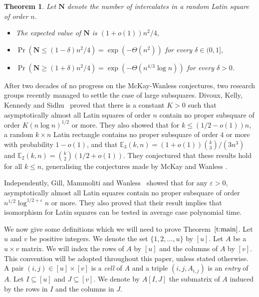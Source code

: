 \documentclass[12pt]{article}
\newtheorem{thm}{Theorem}[section]
\theoremstyle{definition}
\numberwithin{equation}{section}
\def\tref#1{Theorem~$\ref{#1}$}
\renewcommand{\geq}{\geqslant}
\renewcommand{\leq}{\leqslant}
\renewcommand{\le}{\leqslant}
\newcommand{\E}{\mathbb{E}}
\renewcommand{\epsilon}{\varepsilon}
\begin{document}
	\begin{thm}\label{t:intercs}
	  Let $\mathbf{N}$ denote the number of intercalates in a random Latin
	  square of order $n$.
	  \begin{itemize}
	  \item The expected value of $\mathbf{N}$ is $(1+o(1))n^2/4$,
	  \item $\Pr(\mathbf{N} \leq (1-\delta)n^2/4) = \exp(-\Theta(n^2))$ for every $\delta \in (0, 1]$,
	  \item $\Pr(\mathbf{N} \geq (1+\delta)n^2/4) = \exp(-\Theta(n^{4/3}\log n))$ for every $\delta>0$.
	  \end{itemize} 
	\end{thm}
	
	After two decades of no progress on the McKay-Wanless
        conjectures, two research groups recently managed to settle
        the case of large subsquares. Divoux, Kelly, Kennedy and
        Sidhu~\cite{subsqrandom} proved that there is a constant $K>0$
        such that asymptotically almost all Latin squares of order $n$
        contain no proper subsquare of order $K(n\log n)^{1/2}$ or
        more.  They also showed that for $k\le(1/2-o(1))n$, a random
        $k\times n$ Latin rectangle contains no proper subsquare of
        order $4$ or more with probability $1-o(1)$, and that
        $\E_3(k,n)=(1+o(1))\binom{k}{3}/(3n^3)$ and $\E_2(k,n)=\binom
        k2(1/2+o(1))$. They conjectured that these results hold for
        all $k\le n$, generalising the conjectures made by McKay and
        Wanless \cite{manysubsq}.
	
	Independently, Gill, Mammoliti and Wanless~\cite{canonicallabel}
	showed that for any $\epsilon>0$, asymptotically almost all Latin
	squares contain no proper subsquare of order
	$n^{1/2}\log^{1/2+\epsilon} n$ or more. They also proved that their
	result implies that isomorphism for Latin squares can be tested in
	average case polynomial time.
	
	
	
	
	\medskip
	
	We now give some definitions which we will need to prove
	\tref{t:main}. Let $u$ and $v$ be positive integers. We denote the set
	$\{1, 2, \ldots, u\}$ by $[u]$. Let $A$ be a $u \times v$ matrix. We
	will index the rows of $A$ by $[u]$ and the columns of $A$ by
	$[v]$. This convention will be adopted throughout this paper, unless
	stated otherwise. A pair $(i, j) \in [u] \times [v]$ is a \emph{cell}
	of $A$ and a triple $(i, j, A_{i, j})$ is an \emph{entry} of $A$. Let
	$I \subseteq [u]$ and $J \subseteq [v]$. We denote by $A[I,J]$ the
	submatrix of $A$ induced by the rows in $I$ and the columns in $J$.
	
\end{document}
